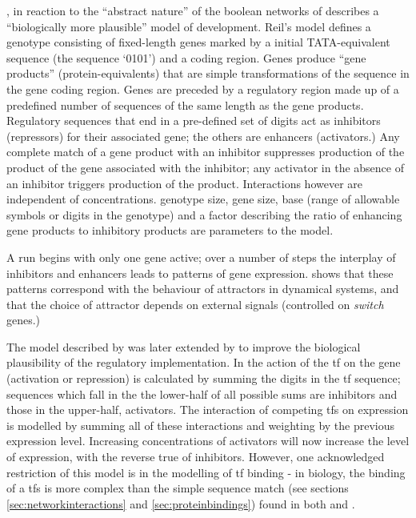 \cite{Reil:1999rp}, in reaction to the ``abstract nature''\parencite[pg. 1]{Reil:1999rp} of the boolean networks of \cite{Kauffman:1969ne} describes a ``biologically more plausible'' \cite[pg. 1]{Reil:1999rp} model of development. Reil's model defines a genotype consisting of fixed-length genes
marked by a initial TATA-equivalent sequence (the sequence `0101') and a coding region. Genes produce ``gene products''
(protein-equivalents) that are simple transformations of the sequence in the gene coding region. Genes are preceded by a
regulatory region made up of a predefined number of sequences of the same length as the gene products. Regulatory
sequences that end in a pre-defined set of digits act as inhibitors (repressors) for their associated gene; the others
are enhancers (activators.) Any complete match of a gene product with an inhibitor suppresses production of the product
of the gene associated with the inhibitor; any activator in the absence of an inhibitor triggers production of the
product. Interactions however are independent of concentrations. genotype size, gene size, base (range of allowable
symbols or digits in the genotype) and a factor describing the ratio of enhancing gene products to inhibitory products are
parameters to the model.

A run begins with only one gene active; over a number of steps the interplay of inhibitors and enhancers leads to
patterns of gene expression. \cite{Reil:1999rp} shows that these patterns correspond with the behaviour of attractors
in dynamical systems, and that the choice of attractor depends on external signals (controlled on \emph{switch} genes.)

The model described by \cite{Reil:1999rp} was later extended by \cite{Rohlf:2009sh} to improve the
biological plausibility of the regulatory implementation. In \cite{Rohlf:2009sh} the action of the \gls{tf} on the gene
(activation or repression) is calculated by summing the digits in the \gls{tf} sequence; sequences which fall in the the
lower-half of all possible sums are inhibitors and those in the upper-half, activators. The interaction of competing
\glspl{tf} on expression is modelled by summing all of these interactions and weighting by the previous expression
level. Increasing concentrations of activators will now increase the level of expression, with the reverse true of
inhibitors. However, one acknowledged restriction of this model is in the modelling of \gls{tf} binding - in biology,
the binding of a \glspl{tf} is more complex than the simple sequence match (see sections \ref{sec:networkinteractions}
and \ref{sec:proteinbindings}) found in both \cite{Reil:1999rp} and \cite{Rohlf:2009sh}.

